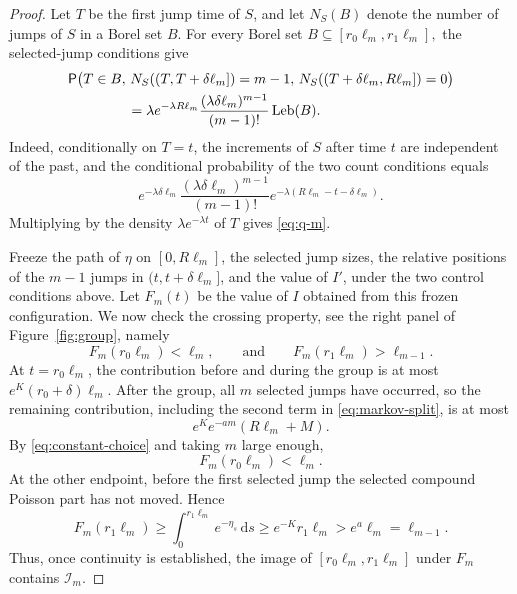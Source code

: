 \documentclass[11pt]{article}
\newcommand{\Prob}{\mathsf P}
\newcommand{\1}{\mathbf 1}
\newcommand{\dd}{\mathrm d}
\begin{document}
\begin{proof}
Let $T$ be the first jump time of $S$, and let $N_S(B)$ denote the number of jumps of $S$ in a Borel set $B$. For every Borel set
$
 B\subseteq [r_0\ell_m,r_1\ell_m],
$
the selected-jump conditions give
\begin{equation}\label{eq:q-m}
\begin{aligned}
&\Prob\big(
 T\in B,\,
 N_S((T,T+\delta\ell_m])=m-1,\,
 N_S((T+\delta\ell_m,R\ell_m])=0
 \big)  \\
&\hspace{1.5cm}
 =
 \lambda e^{-\lambda R\ell_m}
 \frac{(\lambda\delta\ell_m)^{m-1}}{(m-1)!}
 \,\mathrm{Leb}(B).
\end{aligned}
\end{equation}
Indeed, conditionally on $T=t$, the increments of $S$ after time $t$ are independent of the past, and the conditional probability of the two count conditions equals
\[
 e^{-\lambda\delta\ell_m}
 \frac{(\lambda\delta\ell_m)^{m-1}}{(m-1)!}
 e^{-\lambda(R\ell_m-t-\delta\ell_m)}.
\]
Multiplying by the density $\lambda e^{-\lambda t}$ of $T$ gives \eqref{eq:q-m}.

Freeze the path of $\eta$ on $[0,R\ell_m]$, the selected jump sizes, the relative positions of the $m-1$ jumps in $(t,t+\delta\ell_m]$, and the value of $I'$, under the two control conditions above. Let $F_m(t)$ be the value of $I$ obtained from this frozen configuration. We now check the crossing property, see the right panel of Figure~\ref{fig:group}, namely
\[
 F_m(r_0\ell_m)<\ell_m,
 \qquad \text{and}\qquad
 F_m(r_1\ell_m)>\ell_{m-1}.
\]
At $t=r_0\ell_m$, the contribution before and during the group is at most $e^K(r_0+\delta)\ell_m$. After the group, all $m$ selected jumps have occurred, so the remaining contribution, including the second term in \eqref{eq:markov-split}, is at most
\[
 e^Ke^{-am}(R\ell_m+M).
\]
By \eqref{eq:constant-choice} and taking $m$ large enough,
\[
 F_m(r_0\ell_m)<\ell_m.
\]
At the other endpoint, before the first selected jump the selected compound Poisson part has not moved. Hence
\[
 F_m(r_1\ell_m)
 \geq
 \int_0^{r_1\ell_m}e^{-\eta_s}\,\dd s
 \geq
 e^{-K}r_1\ell_m
 >
 e^a\ell_m
 =
 \ell_{m-1}.
\]
Thus, once continuity is established, the image of $[r_0\ell_m,r_1\ell_m]$ under $F_m$ contains $\mathcal I_m$.


\end{proof}
\end{document}

